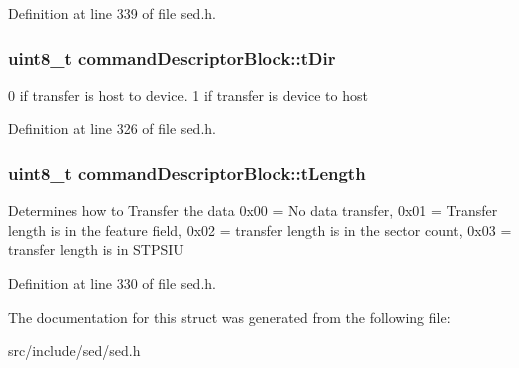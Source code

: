 Definition at line 339 of file sed.\+h.

\hypertarget{structcommandDescriptorBlock_a31331001191953ebd586ef73c3a876b3}{
\subsubsection[{t\+Dir}]{\setlength{\rightskip}{0pt plus 5cm}uint8\+\_\+t command\+Descriptor\+Block\+::t\+Dir}}\label{structcommandDescriptorBlock_a31331001191953ebd586ef73c3a876b3}
0 if transfer is host to device. 1 if transfer is device to host 

Definition at line 326 of file sed.\+h.

\hypertarget{structcommandDescriptorBlock_a610b82f3718b46e8cb797403c7f39a02}{
\subsubsection[{t\+Length}]{\setlength{\rightskip}{0pt plus 5cm}uint8\+\_\+t command\+Descriptor\+Block\+::t\+Length}}\label{structcommandDescriptorBlock_a610b82f3718b46e8cb797403c7f39a02}
Determines how to Transfer the data 0x00 = No data transfer, 0x01 = Transfer length is in the feature field, 0x02 = transfer length is in the sector count, 0x03 = transfer length is in S\+T\+P\+S\+I\+U 

Definition at line 330 of file sed.\+h.



The documentation for this struct was generated from the following file\+:\begin{DoxyCompactItemize}
\item 
src/include/sed/sed.\+h\end{DoxyCompactItemize}
